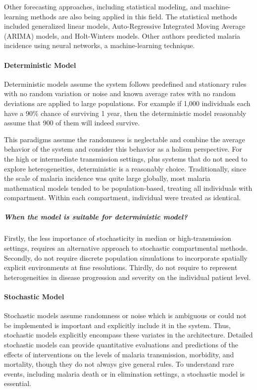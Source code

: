 \documentclass[a4paper, 12pt, twoside]{article}
\begin{document}
Other forecasting approaches, including statistical modeling, and machine-learning methods are also being applied in this field.
The statistical methods included generalized linear models, Auto-Regressive Integrated Moving Average (ARIMA) models\cite{box2015time,Anokye2018}, and Holt-Winters models\cite{Chatfield1978}.
Other authors\cite{Toh2021a,Libbrecht2015,Nkiruka2021,Verma2020,Kim2019,Khameneh2014,Ebhuoma2018,Hancock2020} predicted malaria incidence using neural networks, a machine-learning technique.

\paragraph{Deterministic Model}%
\label{par:deterministic_model}

Deterministic models assume the system follows predefined and stationary rules with no random variation or noise and known average rates with no random deviations are applied to large populations.
For example if 1,000 individuals each have a 90\% chance of surviving 1 year, then the deterministic model reasonably assume that 900 of them will indeed survive.

This paradigms assume the randomness is neglectable and combine the average behavior of the system and consider this behavior as a holism perspective.
For the high or intermediate transmission settings, plus systems that do not need to explore heterogeneities, deterministic is a reasonably choice.
Traditionally, since the scale of malaria incidence was quite large globally, most malaria mathematical models tended to be population-based, treating all individuals with compartment.
Within each compartment, individual were treated as identical.

\subparagraph{When the model is suitable for deterministic model?}%
\label{par:when_the_model_is_suitable_for_deterministic_model_}
Firstly, the less importance of stochasticity in median or high-transmission settings, requires an alternative approach to stochastic compartmental methods.
Secondly, do not require discrete population simulations to incorporate spatially explicit environments at fine resolutions.
Thirdly, do not require to represent heterogeneities in disease progression and severity on the individual patient level.

\paragraph{Stochastic Model}
\label{par:stochastic_model}
Stochastic models assume randomness or noise which is ambiguous or could not be implemented is important and explicitly include it in the system.
Thus, stochastic models explicitly encompass these variates in the architecture.
Detailed stochastic models can provide quantitative evaluations and predictions of the effects of interventions on the levels of malaria transmission, morbidity, and mortality, though they do not always give general rules.
To understand rare events, including malaria death or in elimination settings, a stochastic model is essential.
\end{document}
